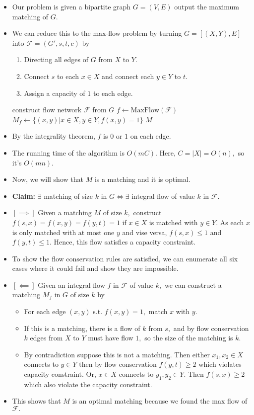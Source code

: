 \documentclass[a4paper,12pt]{article}
\begin{document}
\begin{itemize}
    \item Our problem is given a bipartite graph $G=(V,E)$ output the maximum matching of $G.$
    \item We can reduce this to the max-flow problem by turning $G=[(X,Y),E]$ into $\mathcal F=(G',s,t,c)$ by \begin{enumerate}
        \item Directing all edges of $G$ from $X$ to $Y.$
        \item Connect $s$ to each $x\in X$ and connect each $y\in Y$ to $t.$
        \item Assign a capacity of $1$ to each edge.
    \end{enumerate}
    \begin{algorithmic}[1]
        \State construct flow network $\mathcal F$ from $G$
        \State $f\gets\mathrm{MaxFlow}(\mathcal F)$
        \State $M_f\gets\{(x,y)|x\in X,y\in Y, f(x,y)=1\}$
        \State \Return $M$
        \EndProcedure
    \end{algorithmic}
    \item By the integrality theorem, $f$ is $0$ or $1$ on each edge.
    \item The running time of the algorithm is $O(mC).$ Here, $C=|X|=O(n),$ so it's $O(mn).$
    \item Now, we will show that $M$ is a matching and it is optimal.
    \item \textbf{Claim:} $\exists$ matching of size $k$ in $G\iff\exists$ integral flow of value $k$ in $\mathcal F.$
    \item $[\implies]$ Given a matching $M$ of size $k,$ construct $f(s,x)=f(x,y)=f(y,t)=1$ if $x\in X$ is matched with $y\in Y.$ As each $x$ is only matched with at most one $y$ and vise versa, $f(s,x)\leq1$ and $f(y,t)\leq1.$ Hence, this flow satisfies a capacity constraint.
    \item To show the flow conservation rules are satisfied, we can enumerate all six cases where it could fail and show they are impossible.
    \item $[\impliedby]$ Given an integral flow $f$ in $\mathcal F$ of value $k,$ we can construct a matching $M_f$ in $G$ of size $k$ by \begin{itemize}
        \item For each edge $(x,y)$ s.t. $f(x,y)=1,$ match $x$ with $y.$ 
        \item If this is a matching, there is a flow of $k$ from $s,$ and by flow conservation $k$ edges from $X$ to $Y$ must have flow $1,$ so the size of the matching is $k.$ 
        \item  By contradiction suppose this is not a matching. Then either $x_1,x_2\in X$ connects to $y\in Y$ then by flow conservation $f(y,t)\geq2$ which violates capacity constraint. Or, $x\in X$ connects to $y_1,y_2\in Y.$ Then $f(s,x)\geq2$ which also violate the capacity constraint.  
    \end{itemize}
    \item This shows that $M$ is an optimal matching because we found the max flow of $\mathcal F.$
\end{itemize}
\end{document}
